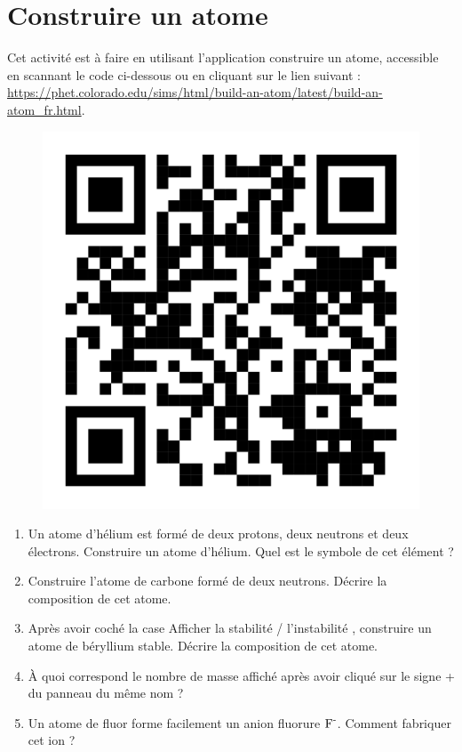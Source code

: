 \documentclass[12pt,a4paper]{article}
\begin{document}
\section*{Construire un atome}

Cet activité est à faire en utilisant l'application construire un atome, accessible en scannant le code ci-dessous ou en cliquant sur le lien suivant : \href{https://phet.colorado.edu/sims/html/build-an-atom/latest/build-an-atom_fr.html}{https://phet.colorado.edu/sims/html/build-an-atom/latest/build-an-atom\_fr.html}.

\begin{figure}[h]
\center
\includegraphics[scale=0.05]{images/qr_phetcolorado_atom.png}
\end{figure}

\begin{enumerate}
\item Un atome d'hélium est formé de deux protons, deux neutrons et deux électrons.
Construire un atome d'hélium.
Quel est le symbole de cet élément ?

\item Construire l'atome de carbone formé de deux neutrons.
Décrire la composition de cet atome.

\item Après avoir coché la case \og Afficher la stabilité / l'instabilité \fg{}, construire un atome de béryllium stable.
Décrire la composition de cet atome.

\item À quoi correspond le nombre de masse affiché après avoir cliqué sur le signe \og + \fg{} du panneau du même nom ?

\item Un atome de fluor forme facilement un anion fluorure $\text{F}^\text{-}$.
Comment fabriquer cet ion ?
\end{enumerate}
\end{document}
